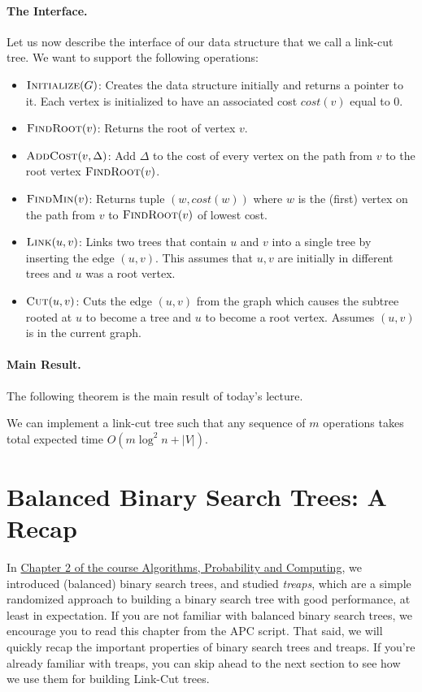 \paragraph{The Interface.} Let us now describe the interface of our data structure that we call a link-cut tree. We want to support the following operations:
\begin{itemize}
    \item $\textsc{Initialize}(G)$: Creates the data structure initially and returns a pointer to it. Each vertex is initialized to have an associated cost $cost(v)$ equal to $0$.
    \item $\textsc{FindRoot}(v)$: Returns the root of vertex $v$. 
    \item $\textsc{AddCost}(v, \Delta)$: Add $\Delta$ to the cost of every vertex on the path from $v$ to the root vertex $\textsc{FindRoot}(v)$.
    \item $\textsc{FindMin}(v)$: Returns tuple $(w, cost(w))$ where $w$ is the (first) vertex on the path from $v$ to $\textsc{FindRoot}(v)$ of lowest cost. 
    \item $\textsc{Link}(u,v)$: Links two trees that contain $u$ and $v$ into a single tree by inserting the edge $(u,v)$. This assumes that $u, v$ are initially in different trees and $u$ was a root vertex.
    \item $\textsc{Cut}(u,v)$: Cuts the edge $(u,v)$ from the graph which causes the subtree rooted at $u$ to become a tree and $u$ to become a root vertex. Assumes $(u,v)$ is in the current graph.
\end{itemize}

\paragraph{Main Result.} The following theorem is the main result of today's lecture.

\begin{theorem}\label{thm:mainTheoremLinkCutTree}
We can implement a link-cut tree such that any sequence of $m$ operations takes total expected time $O(m \log^2 n + |V|)$.
\end{theorem}


\section{Balanced Binary Search Trees: A Recap}
In \href{https://ti.inf.ethz.ch/ew/courses/APC21/Chapter_2.pdf}{Chapter 2 of the course Algorithms, Probability and Computing}, we introduced (balanced) binary search trees, and studied \emph{treaps}, which are a simple randomized approach to building a binary search tree with good performance, at least in expectation.
If you are not familiar with balanced binary search trees, we encourage you to read this chapter from the APC script. 
That said, we will quickly recap the important properties of binary search trees and treaps.
If you're already familiar with treaps, you can skip ahead to the next section to see how we use them for building Link-Cut trees.

